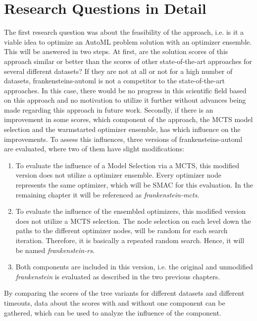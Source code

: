 \section{Research Questions in Detail}
The first research question was about the feasibility of the approach, i.e. is it a viable idea to optimize an AutoML problem solution with an optimizer ensemble.
This will be answered in two steps.\newline
At first, are the solution scores of this approach similar or better than the scores of other state-of-the-art approaches for several different datasets?
If they are not at all or not for a high number of datasets, frankensteins-automl is not a competitor to the state-of-the-art approaches.
In this case, there would be no progress in this scientific field based on this approach and no motivation to utilize it further without advances being made regarding this approach in future work.\newline
Secondly, if there is an improvement in some scores, which component of the approach, the MCTS model selection and the warmstarted optimizer ensemble, has which influence on the improvements.
To assess this influences, three versions of frankensteins-automl are evaluated, where two of them have slight modifications:
\begin{enumerate}
    \item To evaluate the influence of a Model Selection via a MCTS, this modified version does not utilize a optimizer ensemble.
    Every optimizer node represents the same optimizer, which will be SMAC for this evaluation.
    In the remaining chapter it will be referenced as \textit{frankenstein-mcts.}
    \item To evaluate the influence of the ensembled optimizers, this modified version does not utilize a MCTS selection.
    The node selection on each level down the paths to the different optimizer nodes, will be random for each search iteration.
    Therefore, it is basically a repeated random search.
    Hence, it will be named \textit{frankenstein-rs}.
    \item Both components are included in this version, i.e. the original and unmodified \textit{frankenstein} is evaluated as described in the two previous chapters.
\end{enumerate}
By comparing the scores of the tree variants for different datasets and different timeouts, data about the scores with and without one component can be gathered, which can be used to analyze the influence of the component.

